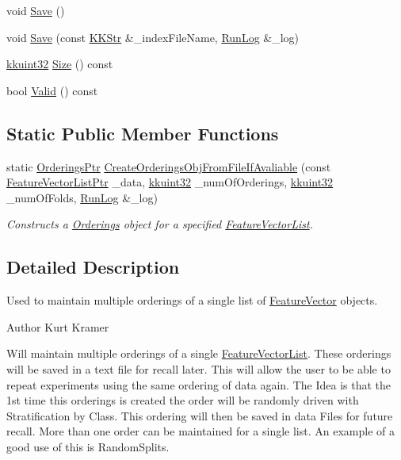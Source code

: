 \begin{DoxyCompactItemize}
\item 
void \hyperlink{class_k_k_m_l_l_1_1_orderings_a98a2adb8640f14147a8a43b557806559}{Save} ()
\item 
void \hyperlink{class_k_k_m_l_l_1_1_orderings_aa6be564b1c77f4c85b73fe04ded45398}{Save} (const \hyperlink{class_k_k_b_1_1_k_k_str}{K\+K\+Str} \&\+\_\+index\+File\+Name, \hyperlink{class_k_k_b_1_1_run_log}{Run\+Log} \&\+\_\+log)
\item 
\hyperlink{namespace_k_k_b_af8d832f05c54994a1cce25bd5743e19a}{kkuint32} \hyperlink{class_k_k_m_l_l_1_1_orderings_aa919a41094ca11a5479f2c30ea4f7a67}{Size} () const 
\item 
bool \hyperlink{class_k_k_m_l_l_1_1_orderings_a6099411b7e4c7696d3ee63be21c8dfdd}{Valid} () const 
\end{DoxyCompactItemize}
\subsection*{Static Public Member Functions}
\begin{DoxyCompactItemize}
\item 
static \hyperlink{class_k_k_m_l_l_1_1_orderings_af1bbd9a32dc13a33a747c4c5c0112714}{Orderings\+Ptr} \hyperlink{class_k_k_m_l_l_1_1_orderings_a5fc979fa80ebf5a33b529fc066646148}{Create\+Orderings\+Obj\+From\+File\+If\+Avaliable} (const \hyperlink{namespace_k_k_m_l_l_acf2ba92a3cf03e2b19674b24ff488ef6}{Feature\+Vector\+List\+Ptr} \+\_\+data, \hyperlink{namespace_k_k_b_af8d832f05c54994a1cce25bd5743e19a}{kkuint32} \+\_\+num\+Of\+Orderings, \hyperlink{namespace_k_k_b_af8d832f05c54994a1cce25bd5743e19a}{kkuint32} \+\_\+num\+Of\+Folds, \hyperlink{class_k_k_b_1_1_run_log}{Run\+Log} \&\+\_\+log)
\begin{DoxyCompactList}\small\item\em Constructs a \hyperlink{class_k_k_m_l_l_1_1_orderings}{Orderings} object for a specified \hyperlink{class_k_k_m_l_l_1_1_feature_vector_list}{Feature\+Vector\+List}. \end{DoxyCompactList}\end{DoxyCompactItemize}


\subsection{Detailed Description}
Used to maintain multiple orderings of a single list of \hyperlink{class_k_k_m_l_l_1_1_feature_vector}{Feature\+Vector} objects. 

\begin{DoxyAuthor}{Author}
Kurt Kramer
\end{DoxyAuthor}
Will maintain multiple orderings of a single \hyperlink{class_k_k_m_l_l_1_1_feature_vector_list}{Feature\+Vector\+List}. These orderings will be saved in a text file for recall later. This will allow the user to be able to repeat experiments using the same ordering of data again. The Idea is that the 1st time this orderings is created the order will be randomly driven with Stratification by Class. This ordering will then be saved in data Files for future recall. More than one order can be maintained for a single list. An example of a good use of this is Random\+Splits. 

